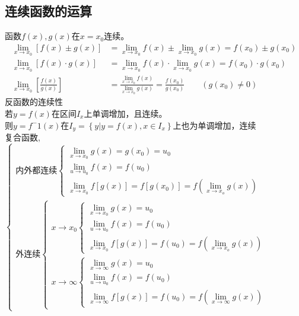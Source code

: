 \subsection{连续函数的运算}
函数$f(x),g(x)$在$x=x_0$连续。
\begin{displaymath}
    \begin{split}
        \lim\limits_{x\to x_0}\left[f(x)\pm g(x)\right]&=\lim\limits_{x\to x_0}f(x)\pm \lim\limits_{x\to x_0}g(x)=f(x_0)\pm g(x_0)\\
        \lim\limits_{x\to x_0}\left[f(x)\cdot g(x)\right]&=\lim\limits_{x\to x_0}f(x)\cdot \lim\limits_{x\to x_0}g(x)=f(x_0)\cdot g(x_0)\\
        \lim\limits_{x\to x_0}\left[\frac{f(x)}{g(x)}\right]&=\frac{\lim\limits_{x\to x_0}f(x)}{\lim\limits_{x\to x_0}g(x)}=\frac{f(x_0)}{g(x_0)}\qquad \left(g(x_0)\neq 0\right)
    \end{split}
\end{displaymath}
反函数的连续性\\
若$y=f(x)$在区间$I_x$上单调增加，且连续。\\
则$y=f^-1(x)$在$I_y=\left\{y|y=f(x),x\in I_x\right\}$上也为单调增加，连续\\
复合函数,$\begin{cases}
    \mbox{内外都连续}\begin{cases}
    \lim\limits_{x\to x_0}g(x)=g(x_0)=u_0\\
    \lim\limits_{u\to u_0}f(x)=f(u_0)\\
    \lim\limits_{x\to x_0}f\left[g(x)\right]=f\left[g(x_0)\right]=f(\lim\limits_{x\to x_o}g(x))
\end{cases}\\
    \mbox{外连续}\begin{cases}
        x\rightarrow x_0\begin{cases}
        \lim\limits_{x\to x_0}g(x)=u_0\\
        \lim\limits_{u\to u_0}f(x)=f(u_0)\\
        \lim\limits_{x\to x_0}f\left[g(x)\right]=f(u_0)=f(\lim\limits_{x\to x_o}g(x))
    \end{cases}\\
        x\rightarrow \infty\begin{cases}
            \lim\limits_{x\to \infty}g(x)=u_0\\
            \lim\limits_{u\to u_0}f(x)=f(u_0)\\
            \lim\limits_{x\to \infty}f\left[g(x)\right]=f(u_0)=f(\lim\limits_{x\to \infty}g(x))
        \end{cases}
    \end{cases}
\end{cases}$



